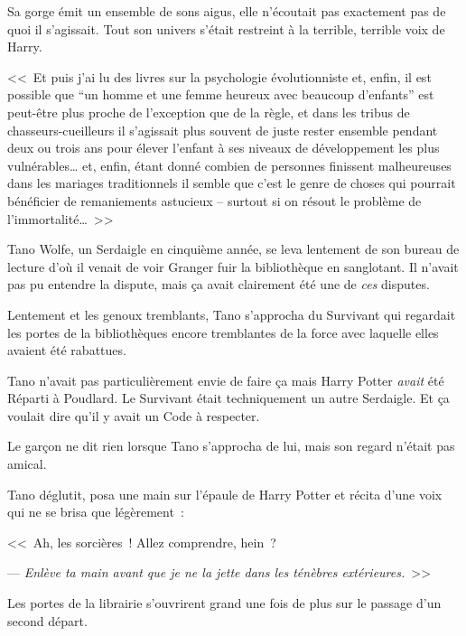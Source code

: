 Sa gorge émit un ensemble de sons aigus, elle n'écoutait pas exactement pas de quoi il s'agissait. Tout son univers s'était restreint à la terrible, terrible voix de Harry.

<<~Et puis j'ai lu des livres sur la psychologie évolutionniste et, enfin, il est possible que “un homme et une femme heureux avec beaucoup d'enfants” est peut-être plus proche de l'exception que de la règle, et dans les tribus de chasseurs-cueilleurs il s'agissait plus souvent de juste rester ensemble pendant deux ou trois ans pour élever l'enfant à ses niveaux de développement les plus vulnérables… et, enfin, étant donné combien de personnes finissent malheureuses dans les mariages traditionnels il semble que c'est le genre de choses qui pourrait bénéficier de remaniements astucieux -- surtout si on résout le problème de l'immortalité…~>>

\later

Tano Wolfe, un Serdaigle en cinquième année, se leva lentement de son bureau de lecture d'où il venait de voir Granger fuir la bibliothèque en sanglotant. Il n'avait pas pu entendre la dispute, mais ça avait clairement été une de \emph{ces} disputes.

Lentement et les genoux tremblants, Tano s'approcha du Survivant qui regardait les portes de la bibliothèques encore tremblantes de la force avec laquelle elles avaient été rabattues.

Tano n'avait pas particulièrement envie de faire ça mais Harry Potter \emph{avait} été Réparti à Poudlard. Le Survivant était techniquement un autre Serdaigle. Et ça voulait dire qu'il y avait un Code à respecter.

Le garçon ne dit rien lorsque Tano s'approcha de lui, mais son regard n'était pas amical.

Tano déglutit, posa une main sur l'épaule de Harry Potter et récita d'une voix qui ne se brisa que légèrement~:

<<~Ah, les sorcières~! Allez comprendre, hein~?

--- \emph{Enlève ta main avant que je ne la jette dans les ténèbres extérieures.}~>>

Les portes de la librairie s'ouvrirent grand une fois de plus sur le passage d'un second départ.

